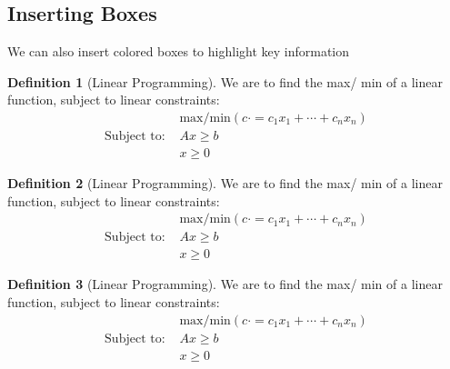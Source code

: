 \documentclass[10pt]{article}
\theoremstyle{plain}
\theoremstyle{definition}
\newtheorem{definition}{Definition}[section]
\theoremstyle{remark}
\theoremstyle{exercise-style}
\numberwithin{equation}{section}
\numberwithin{theorem}{section}
\numberwithin{remark}{section}
\begin{document}
\subsection{Inserting Boxes}

We can also insert colored boxes to highlight key information

\begin{myboxg}
    \begin{definition}[Linear Programming]
       We are to find the max/ min of a linear function, subject to linear constraints:
       \begin{align}
           & \text{max/min}(c \cdot = c_1x_1 + \cdots + c_n x_n) \\
           \text{Subject to: } & Ax \geq b \\
           & x \geq 0
       \end{align}
    \end{definition}
\end{myboxg}

\begin{myboxb}
    \begin{definition}[Linear Programming]
       We are to find the max/ min of a linear function, subject to linear constraints:
       \begin{align}
           & \text{max/min}(c \cdot = c_1x_1 + \cdots + c_n x_n) \\
           \text{Subject to: } & Ax \geq b \\
           & x \geq 0
       \end{align}
    \end{definition}
\end{myboxb}

\begin{myboxr}
    \begin{definition}[Linear Programming]
       We are to find the max/ min of a linear function, subject to linear constraints:
       \begin{align}
           & \text{max/min}(c \cdot = c_1x_1 + \cdots + c_n x_n) \\
           \text{Subject to: } & Ax \geq b \\
           & x \geq 0
       \end{align}
    \end{definition}
\end{myboxr}


\end{document}

